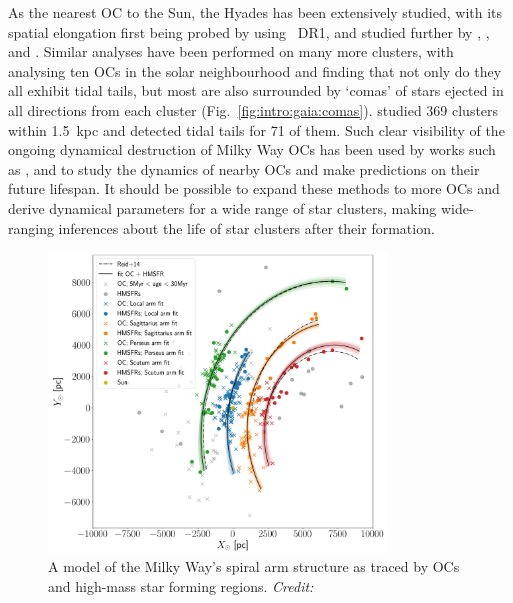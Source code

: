 As the nearest OC to the Sun, the Hyades has been extensively studied, with its spatial elongation first being probed by \cite{reino_gaia_study_2018} using \gaia\ DR1, and studied further by \cite{lodieu_3d_view_2019}, \cite{röser_hyades_tidal_2019}, and \cite{meingast_extended_stellar_2019}. Similar analyses have been performed on many more clusters, with \cite{meingast_extended_2021} analysing ten OCs in the solar neighbourhood and finding that not only do they all exhibit tidal tails, but most are also surrounded by `comas' of stars ejected in all directions from each cluster (Fig.~\ref{fig:intro:gaia:comas}). \cite{tarricq_structural_2022} studied 369 clusters within 1.5~kpc and detected tidal tails for 71 of them. Such clear visibility of the ongoing dynamical destruction of Milky Way OCs has been used by works such as \cite{yeh_ruprecht_2019}, \cite{oh_kinematic_modelling_2020} and \cite{pang_3d_2021} to study the dynamics of nearby OCs and make predictions on their future lifespan. It should be possible to expand these methods to more OCs and derive dynamical parameters for a wide range of star clusters, making wide-ranging inferences about the life of star clusters after their formation.

\begin{figure}[t]
	\centering
	\includegraphics[width=0.8\textwidth]{fig/c1/spiral_arms.png}
	\caption[A model of the Milky Way's spiral arm structure as traced by OCs and high-mass star forming regions]{A model of the Milky Way's spiral arm structure as traced by OCs and high-mass star forming regions. \emph{Credit:} \cite{castro-ginard_milky_2021}}
	\label{fig:intro:gaia:spiral}
\end{figure}

